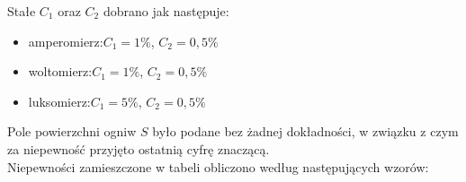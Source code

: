 \documentclass[12pt,a4paper]{article}
\begin{document}
Stałe $C_1$ oraz $C_2$ dobrano jak następuje:
\begin{itemize}
\TabPositions{3cm}
\item amperomierz:\tab$C_1 = 1\%$, $C_2 = 0,5\%$
\item woltomierz:\tab$C_1 = 1\%$, $C_2 = 0,5\%$
\item luksomierz:\tab$C_1 = 5\%$, $C_2 = 0,5\%$
\end{itemize}

Pole powierzchni ogniw $S$ było podane bez żadnej dokładności, w związku z czym za niepewność przyjęto ostatnią cyfrę znaczącą.\\
Niepewności zamieszczone w tabeli obliczono według następujących wzorów:\\
\end{document}
